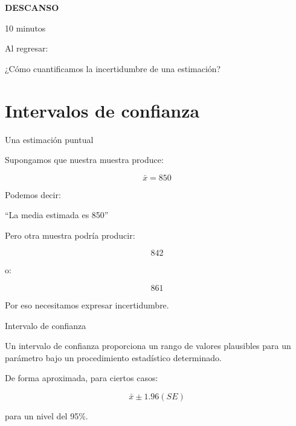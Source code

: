 \documentclass[aspectratio=169,11pt]{beamer}
\begin{document}
\begin{frame}

\begin{center}

{\Huge
\textcolor{azulmarista}{
\textbf{DESCANSO}
}
}

\vspace{0.5cm}

{\Large
10 minutos
}

\vspace{1cm}

Al regresar:

\vspace{0.3cm}

{\Large
¿Cómo cuantificamos la incertidumbre de una estimación?
}

\end{center}

\end{frame}

\section{Intervalos de confianza}

\begin{frame}{Una estimación puntual}

Supongamos que nuestra muestra produce:

\[
\bar{x}=850
\]

Podemos decir:

\begin{center}

\Large
``La media estimada es 850''

\end{center}

\vspace{0.4cm}

Pero otra muestra podría producir:

\[
842
\]

o:

\[
861
\]

Por eso necesitamos expresar incertidumbre.

\end{frame}


\begin{frame}{Intervalo de confianza}

Un intervalo de confianza proporciona un rango de valores plausibles
para un parámetro bajo un procedimiento estadístico determinado.

\vspace{0.5cm}

De forma aproximada, para ciertos casos:

\[
\bar{x}
\pm
1.96(SE)
\]

para un nivel del 95\%.

\end{frame}
\end{document}
